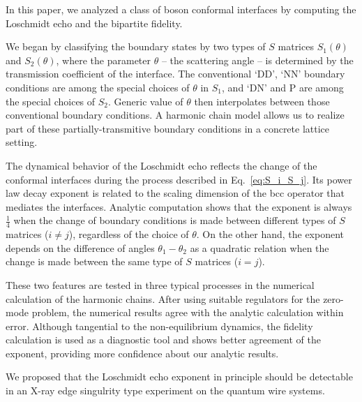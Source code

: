 
In this paper, we analyzed a class of boson conformal interfaces by computing the Loschmidt echo and the bipartite fidelity. 

We began by classifying the boundary states by two types of $S$ matrices $S_1(\theta)$ and $S_2(\theta)$, where the parameter $\theta$ -- the scattering angle -- is determined by the transmission coefficient of the interface. The conventional `DD', `NN' boundary conditions are among the special choices of $\theta$ in $S_1$, and `DN' and P are among the special choices of $S_2$. Generic value of $\theta$ then interpolates between those conventional boundary conditions. A harmonic chain model allows us to realize part of these partially-transmitive boundary conditions in a concrete lattice setting. 

The dynamical behavior of the Loschmidt echo reflects the change of the conformal interfaces during the process described in Eq.~\eqref{eq:S_i_S_j}.
Its power law decay exponent is related to the scaling dimension of the bcc operator that mediates the interfaces. Analytic computation shows that the exponent is always $\frac{1}{4}$ when the change of boundary conditions is made between different types of $S$ matrices ($i \ne j$), regardless of the choice of $\theta$. On the other hand, the exponent depends on the difference of angles $\theta_1 - \theta_2$ as a quadratic relation when the change is made between the same type of $S$ matrices ($i = j$).

These two features are tested in three typical processes in the numerical calculation of the harmonic chains. After using suitable regulators for the zero-mode problem, the numerical results agree with the analytic calculation within error. Although tangential to the non-equilibrium dynamics, the fidelity calculation is used as a diagnostic tool and shows better agreement of the exponent, providing more confidence about our analytic results. 

We proposed that the Loschmidt echo exponent in principle should be detectable in an X-ray edge singulrity type experiment on the quantum wire systems. 

